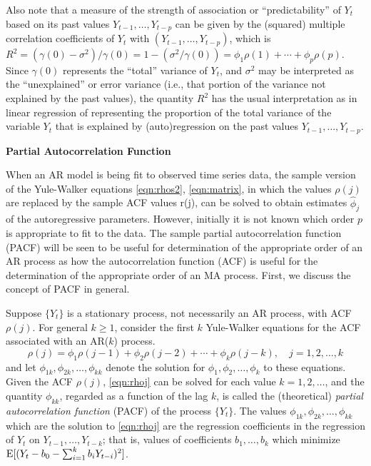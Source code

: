 Also note that a measure of the strength of association or ``predictability'' of $Y_t$ based on its past values $Y_{t-1}, \ldots, Y_{t-p}$ can be given by the (squared) multiple correlation coefficients of $Y_t$ with $(Y_{t-1}, \ldots, Y_{t-p})$, which is $R^2= (\gamma(0) - \sigma^2)/\gamma(0) = 1 - ( \sigma^2 / \gamma(0) ) = \phi_1 \rho(1) + \cdots + \phi_p \rho(p)$. Since $\gamma(0)$ represents the ``total'' variance of $Y_t$, and $\sigma^2$ may be interpreted as the ``unexplained'' or error variance (i.e., that portion of the variance not explained by the past values), the quantity $R^2$ has the usual interpretation as in linear regression of representing the proportion of the total variance of the variable $Y_t$ that is explained by (auto)regression on the past values $Y_{t-1}, \ldots, Y_{t-p}$. \twomedskip


\noindent\textbf{Partial Autocorrelation Function} \label{in:partac1} \twomedskip


When an AR model is being fit to observed time series data, the sample version of the Yule-Walker equations \eqref{eqn:rhos2}, \eqref{eqn:matrix}, in which the values $\rho(j)$ are replaced by the sample ACF values r(j), can be solved to obtain estimates $\hat{\phi}_j$ of the autoregressive parameters. However, initially it is not known which order $p$ is appropriate to fit to the data. The sample partial autocorrelation function (PACF) will be seen to be useful for determination of the appropriate order of an AR process as how the autocorrelation function (ACF) is useful for the determination of the appropriate order of an MA process. First, we discuss the concept of PACF in general.


Suppose $\{ Y_t \}$ is a stationary process, not necessarily an AR process, with ACF $\rho(j)$. For general $k \geq 1$, consider the first $k$ Yule-Walker equations for the ACF associated with an AR($k$) process.
	\begin{equation} \label{eqn:rhoj}
	\rho(j) = \phi_1 \rho(j-1) + \phi_2 \rho(j-2) + \cdots + \phi_k \rho(j-k), \quad j = 1, 2,\ldots, k
	\end{equation}
and let $\phi_{1k}, \phi_{2k}, \ldots, \phi_{kk}$ denote the solution for $\phi_1, \phi_2, \ldots, \phi_k$ to these equations. Given the ACF $\rho(j)$, \eqref{eqn:rhoj} can be solved for each value $k= 1,2, \ldots$, and the quantity $\phi_{kk}$, regarded as a function of the lag $k$, is called the (theoretical) \emph{partial autocorrelation function} (PACF) of the process $\{ Y_t \}$. The values $\phi_{1k},  \phi_{2k}, \ldots, \phi_{kk}$ which are the solution to \eqref{eqn:rhoj} are the regression coefficients in the regression of $Y_t$ on $Y_{t-1}, \ldots, Y_{t-k}$; that is, values of coefficients $b_1, \ldots, b_k$ which minimize $\operatorname{E}[(Y_t - b_0 - \sum_{i=1}^k b_iY_{t-i})^2]$.


